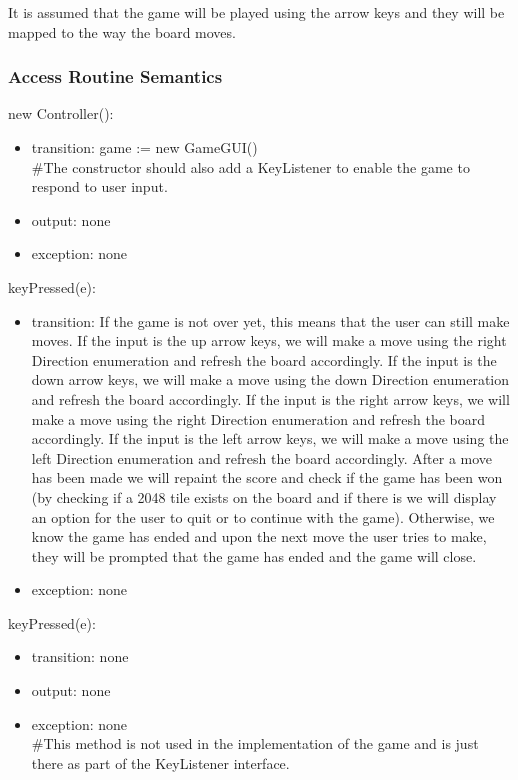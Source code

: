 \documentclass[12pt]{article}
\begin{document}
It is assumed that the game will be played using the arrow keys and they will be mapped to the way the board moves.

\subsubsection* {Access Routine Semantics}

\noindent new Controller():
\begin{itemize}
\item transition: game := new GameGUI()\\
\#The constructor should also add a KeyListener to enable the game to respond to user input.
\item output: none
\item exception: none
\end{itemize}

\noindent keyPressed(e):
\begin{itemize}
\item transition: If the game is not over yet, this means that the user can still make moves. If the input is the up arrow keys, we will make a move using the right Direction enumeration and refresh the board accordingly. If the input is the down arrow keys, we will make a move using the down Direction enumeration and refresh the board accordingly. If the input is the right arrow keys, we will make a move using the right Direction enumeration and refresh the board accordingly. If the input is the left arrow keys, we will make a move using the left Direction enumeration and refresh the board accordingly. After a move has been made we will repaint the score and check if the game has been won (by checking if a 2048 tile exists on the board and if there is we will display an option for the user to quit or to continue with the game). Otherwise, we know the game has ended and upon the next move the user tries to make, they will be prompted that the game has ended and the game will close.
\item exception: none
\end{itemize}

\noindent keyPressed(e):
\begin{itemize}
\item transition: none
\item output: none
\item exception: none\\
\#This method is not used in the implementation of the game and is just there as part of the KeyListener interface.
\end{itemize}
\end{document}
